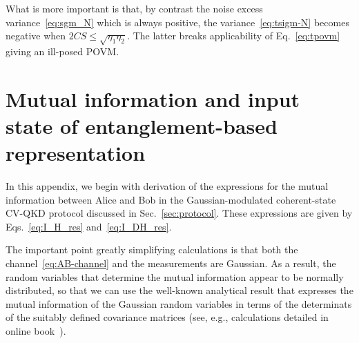 \documentclass[%
reprint,
superscriptaddress,
 amsmath,amssymb,amsfonts,
 aps,
 pra,
 longbibliography
]{revtex4-2}
\begin{document}
What is more important is
that, by contrast the noise excess variance~\eqref{eq:sgm_N}
which is always positive,
the variance~\eqref{eq:tsigm-N} becomes negative
when $2CS\le \sqrt{\eta_1\eta_2}$.
The latter breaks applicability of Eq.~\eqref{eq:tpovm}
giving an ill-posed POVM.


\section{Mutual information and input state
  of entanglement-based representation}
\label{sec:MI-and-EBtoPm}

In this appendix,
we begin with derivation of
the expressions
for the mutual information
between Alice and Bob
in the Gaussian-modulated coherent-state
CV-QKD protocol discussed in Sec.~\ref{sec:protocol}.
These expressions are given by Eqs.~\eqref{eq:I_H_res}
and~\eqref{eq:I_DH_res}.

The important point greatly simplifying calculations
is that both the channel~\eqref{eq:AB-channel}
and the measurements are Gaussian.
As a result, the random variables
that determine the mutual information
appear to be normally distributed,
so that we can use the well-known
analytical result that
expresses the mutual information of the
Gaussian random variables
in terms of the determinats of
the suitably defined covariance matrices
(see, e.g., calculations detailed in online book~\cite{SochEtAl2024_StatProofBook}).
\end{document}
